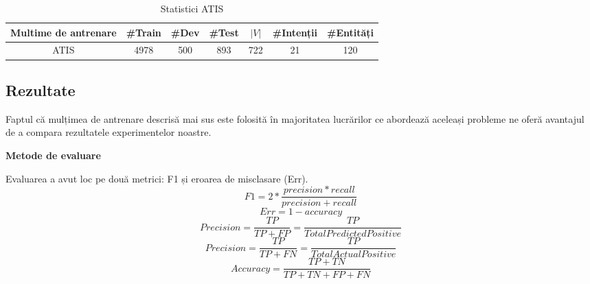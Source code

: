 \begin{table}
	\centering
	\caption{Statistici ATIS}
	\label{atis_stats}
	\begin{adjustbox}{max width=\textwidth}
		\begin{tabular}{ |c|c|c|c|c|c|c| } 
			\hline
			\textbf{Multime de antrenare} & \#Train & \#Dev & \#Test & $|V|$ & \#Intenții & \#Entități \\ 
			\hline
			ATIS & 4978 & 500 & 893 & 722 & 21 & 120 \\
			\hline
		\end{tabular}
	\end{adjustbox}
\end{table}


\subsection{Rezultate}
Faptul că mulțimea de antrenare descrisă mai sus este folosită în majoritatea lucrărilor ce abordează aceleași probleme ne oferă avantajul de a compara rezultatele experimentelor noastre.

\textbf{Metode de evaluare}

Evaluarea a avut loc pe două metrici: F1 și eroarea de misclasare (Err).
$$ F1 = 2 * \frac{precision * recall}{precision + recall} $$
$$ Err = 1 - accuracy $$
$$ Precision = \frac{TP}{TP+FP} = \frac{TP}{Total Predicted Positive} $$
$$ Precision = \frac{TP}{TP+FN} = \frac{TP}{Total Actual Positive} $$
$$ Accuracy = \frac{TP+TN}{TP + TN + FP + FN} $$


